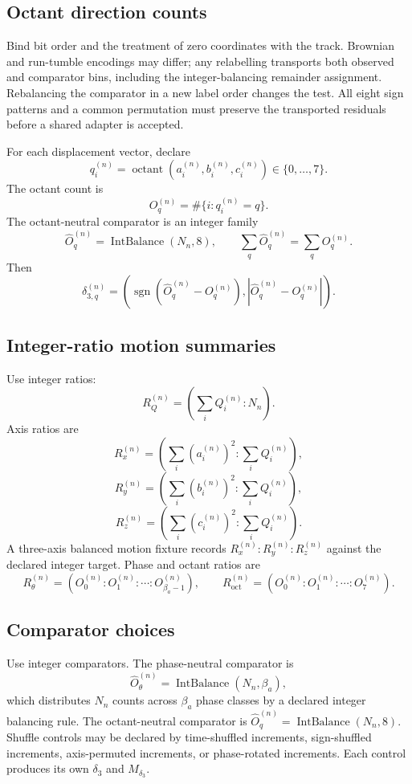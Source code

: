 \subsection{Octant direction counts}
Bind bit order and the treatment of zero coordinates with the track.
Brownian and run-tumble encodings may differ; any relabelling transports
both observed and comparator bins, including the integer-balancing remainder
assignment. Rebalancing the comparator in a new label order changes the
test. All eight sign patterns and a common permutation must preserve the
transported residuals before a shared adapter is accepted.

For each displacement vector, declare
\[
q_i^{(n)}=\operatorname{octant}(a_i^{(n)},b_i^{(n)},c_i^{(n)})\in\{0,\ldots,7\}.
\]
The octant count is
\[
O_q^{(n)}=\#\{i:q_i^{(n)}=q\}.
\]
The octant-neutral comparator is an integer family
\[
\widehat O_q^{(n)}=\operatorname{IntBalance}(N_n,8),
\qquad
\sum_q\widehat O_q^{(n)}=\sum_q O_q^{(n)}.
\]
Then
\[
\delta_{3,q}^{(n)}=\left(\operatorname{sgn}(\widehat O_q^{(n)}-O_q^{(n)}),|\widehat O_q^{(n)}-O_q^{(n)}|\right).
\]

\subsection{Integer-ratio motion summaries}
Use integer ratios:
\[
R_Q^{(n)}=\left(\sum_iQ_i^{(n)}:N_n\right).
\]
Axis ratios are
\[
R_x^{(n)}=\left(\sum_i(a_i^{(n)})^2:\sum_iQ_i^{(n)}\right),
\]
\[
R_y^{(n)}=\left(\sum_i(b_i^{(n)})^2:\sum_iQ_i^{(n)}\right),
\]
\[
R_z^{(n)}=\left(\sum_i(c_i^{(n)})^2:\sum_iQ_i^{(n)}\right).
\]
A three-axis balanced motion fixture records \(R_x^{(n)}:R_y^{(n)}:R_z^{(n)}\) against the declared integer target. Phase and octant ratios are
\[
R_\theta^{(n)}=(O_0^{(n)}:O_1^{(n)}:\cdots:O_{\beta_a-1}^{(n)}),
\qquad
R_{\mathrm{oct}}^{(n)}=(O_0^{(n)}:O_1^{(n)}:\cdots:O_7^{(n)}).
\]

\subsection{Comparator choices}
Use integer comparators. The phase-neutral comparator is
\[
\widehat O_\theta^{(n)}=\operatorname{IntBalance}(N_n,\beta_a),
\]
which distributes \(N_n\) counts across \(\beta_a\) phase classes by a declared integer balancing rule. The octant-neutral comparator is \(\widehat O_q^{(n)}=\operatorname{IntBalance}(N_n,8)\). Shuffle controls may be declared by time-shuffled increments, sign-shuffled increments, axis-permuted increments, or phase-rotated increments. Each control produces its own \(\delta_3\) and \(M_{\delta_3}\).

